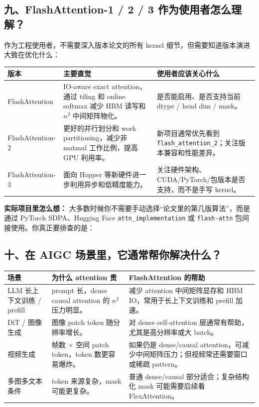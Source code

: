\subsection{九、FlashAttention-1 / 2 / 3 作为使用者怎么理解？}

作为工程使用者，不需要深入版本论文的所有 kernel 细节，但需要知道版本演进大致在优化什么：

\begin{center}
{\small
\begin{tabular}{p{2.8cm}p{5.3cm}p{4.8cm}}
\hline
\textbf{版本} & \textbf{主要直觉} & \textbf{使用者应该关心什么} \\
\hline
FlashAttention & IO-aware exact attention，通过 tiling 和 online softmax 减少 HBM 读写和 $n^2$ 中间矩阵物化。 & 是否能启用、是否支持当前 dtype / head dim / mask。 \\
FlashAttention-2 & 更好的并行划分和 work partitioning，减少非 matmul 工作比例，提高 GPU 利用率。 & 新项目通常优先看到 \texttt{flash\_attention\_2}；关注版本兼容和性能差异。 \\
FlashAttention-3 & 面向 Hopper 等新硬件进一步利用异步和低精度能力。 & 关注硬件架构、CUDA/PyTorch/包版本是否支持，而不是手写 kernel。 \\
\hline
\end{tabular}
}
\end{center}

\begin{intubox}
\textbf{实际项目里怎么想：} 大多数时候你不需要手动选择“论文里的第几版算法”，而是通过 PyTorch SDPA、Hugging Face \texttt{attn\_implementation} 或 \texttt{flash-attn} 包间接使用。你真正要排查的是：
\end{intubox}

\subsection{十、在 AIGC 场景里，它通常帮你解决什么？}

\begin{center}
{\small
\begin{tabular}{p{3.2cm}p{4.7cm}p{4.8cm}}
\hline
\textbf{场景} & \textbf{为什么 attention 贵} & \textbf{FlashAttention 的帮助} \\
\hline
LLM 长上下文训练 / prefill & prompt 长，dense causal attention 的 $n^2$ 压力明显。 & 减少 attention 中间矩阵显存和 HBM IO，常用于长上下文训练和 prefill 加速。 \\
DiT / 图像生成 & 图像 patch token 随分辨率增长。 & 对 dense self-attention 层通常有帮助，尤其是高分辨率或大 batch。 \\
视频生成 & 帧数 $\times$ 空间 patch token，token 数更容易爆炸。 & 如果仍是 dense/causal attention，可减少中间矩阵压力；但视频常还需要窗口或稀疏 pattern。 \\
多图多文本条件 & token 来源复杂，mask 可能更复杂。 & 普通 dense/causal 部分适合；复杂结构化 mask 可能需要后续看 FlexAttention。 \\
\hline
\end{tabular}
}
\end{center}

